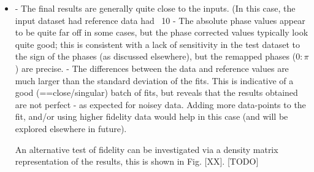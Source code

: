\begin{itemize}
\item 

- The final results are generally quite close to the inputs. (In this case, the input dataset had reference data had ~10%
- The absolute phase values appear to be quite far off in some cases, but the phase corrected values typically look quite good; this is consistent with a lack of sensitivity in the test dataset to the sign of the phases (as discussed elsewhere), but the remapped phases ($0:\pi$) are precise.
- The differences between the data and reference values are much larger than the standard deviation of the fits. This is indicative of a good (==close/singular) batch of fits, but reveals that the results obtained are not perfect - as expected for noisey data. Adding more data-points to the fit, and/or using higher fidelity data would help in this case (and will be explored elsewhere in future).


An alternative test of fidelity can be investigated via a density matrix representation of the results, this is shown in Fig. [XX]. [TODO]








\end{itemize}
